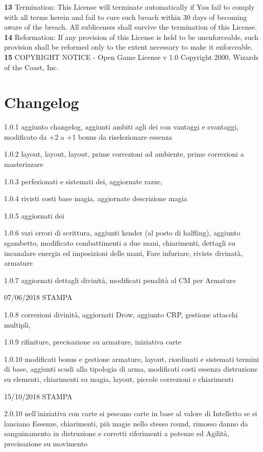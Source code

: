 \documentclass[a4paper,11pt,twoside,openany]{book}
\begin{document}
{	\textbf{13} Termination: This License will terminate automatically if You fail to comply with all terms herein and fail to cure such breach within 30 days of becoming aware of the breach. All sublicenses shall survive the termination of this License.
	\textbf{14} Reformation: If any provision of this License is held to be unenforceable, such provision shall be reformed only to the extent necessary to make it enforceable.
	\textbf{15} COPYRIGHT NOTICE - Open Game License v 1.0 Copyright 2000, Wizards of the Coast, Inc. }

\normalsize

\pagebreak

{\footnotesize
	\section{Changelog}

	1.0.1 aggiunto changelog, aggiunti ambiti agli dei con vantaggi e svantaggi, modificato da +2 a +1 bonus da riselezionare essenza

	1.0.2 layout, layout, layout, prime correzioni ad ambiente, prime correzioni a masterizzare

	1.0.3 perfezionati e sistemati dei, aggiornate razze,

	1.0.4 rivisti costi base magia, aggiornate descrizione magia

	1.0.5 aggiornati dei

	1.0.6 vari errori di scrittura, aggiunti kender (al posto di halfling), aggiunto sgambetto, modificato combattimenti a due mani, chiarimenti, dettagli su incanalare energia ed imposizioni delle mani, Fare infuriare, riviste divinatà, armature

	1.0.7 aggiornati dettagli divinità, modificati penalità al CM per Armature

	07/06/2018 STAMPA

	1.0.8 correzioni divinità, aggiornati Drow, aggiunto CRP, gestione attacchi multipli,

	1.0.9 rifiniture, precisazione su armature, iniziativa carte

	1.0.10 modificati bonus e gestione armature, layout, riordinati e sistemati termini di base, aggiunti scudi alla tipologia di arma, modificati costi essenza distruzione su elementi, chiarimenti su magia, layout, piccole correzioni e chiarimenti

	15/10/2018 STAMPA

	2.0.10 nell'iniziativa con carte si pescano carte in base al valore di Intelletto se si lanciano Essenze, chiarimenti, più magie nello stesso round, rimosso danno da sanguinamento in distruzione e corretti riferimenti a potenze ed Agilità, precisazione su movimento

}
\end{document}

